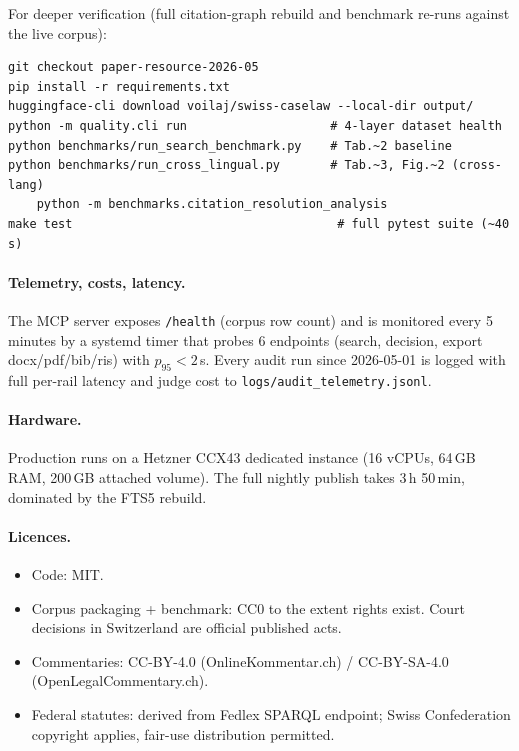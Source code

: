 For deeper verification (full citation-graph rebuild and benchmark
re-runs against the live corpus):
\begin{verbatim}
git checkout paper-resource-2026-05
pip install -r requirements.txt
huggingface-cli download voilaj/swiss-caselaw --local-dir output/
python -m quality.cli run                    # 4-layer dataset health
python benchmarks/run_search_benchmark.py    # Tab.~2 baseline
python benchmarks/run_cross_lingual.py       # Tab.~3, Fig.~2 (cross-lang)
	python -m benchmarks.citation_resolution_analysis
make test                                     # full pytest suite (~40 s)
\end{verbatim}

\paragraph{Telemetry, costs, latency.} The MCP server exposes
\texttt{/health} (corpus row count) and is monitored every 5 minutes
by a systemd timer that probes 6 endpoints (search, decision, export
docx/pdf/bib/ris) with $p_{95}<2$\,s. Every audit run since
2026-05-01 is logged with full per-rail latency and judge cost
to \texttt{logs/audit\_telemetry.jsonl}.

\paragraph{Hardware.} Production runs on a Hetzner CCX43 dedicated
instance (16 vCPUs, 64\,GB RAM, 200\,GB attached volume). The full
nightly publish takes 3\,h 50\,min, dominated by the FTS5 rebuild.

\paragraph{Licences.}
\begin{itemize}
\item Code: MIT.
\item Corpus packaging + benchmark: CC0 to the extent rights exist. Court decisions in Switzerland are official published acts.
\item Commentaries: CC-BY-4.0 (OnlineKommentar.ch) / CC-BY-SA-4.0
  (OpenLegalCommentary.ch).
\item Federal statutes: derived from Fedlex SPARQL endpoint; Swiss
  Confederation copyright applies, fair-use distribution permitted.
\end{itemize}
